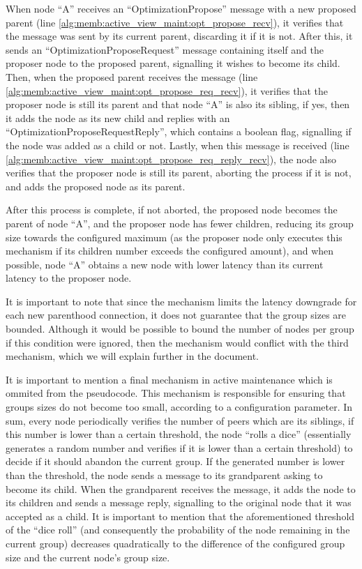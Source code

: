 When node ``A'' receives an ``OptimizationPropose'' message with a new proposed parent (line \ref{alg:memb:active_view_maint:opt_propose_recv}), it verifies that the message was sent by its current parent, discarding it if it is not. After this, it sends an ``OptimizationProposeRequest'' message containing itself and the proposer node to the proposed parent, signalling it wishes to become its child. Then, when the proposed parent receives the message (line \ref{alg:memb:active_view_maint:opt_propose_req_recv}), it verifies that the proposer node is still its parent and that node ``A'' is also its sibling, if yes, then it adds the node as its new child and replies with an ``OptimizationProposeRequestReply'', which contains a boolean flag, signalling if the node was added as a child or not. Lastly, when this message is received (line \ref{alg:memb:active_view_maint:opt_propose_req_reply_recv}), the node also verifies that the proposer node is still its parent, aborting the process if it is not, and adds the proposed node as its parent.

After this process is complete, if not aborted, the proposed node becomes the parent of node ``A'', and the proposer node has fewer children, reducing its group size towards the configured maximum (as the proposer node only executes this mechanism if its children number exceeds the configured amount), and when possible, node ``A'' obtains a new node with lower latency than its current latency to the proposer node.

It is important to note that since the mechanism limits the latency downgrade for each new parenthood connection, it does not guarantee that the group sizes are bounded. Although it would be possible to bound the number of nodes per group if this condition were ignored, then the mechanism would conflict with the third mechanism, which we will explain further in the document. 

It is important to mention a final mechanism in active maintenance which is ommited from the pseudocode. This mechanism is responsible for ensuring that groups sizes do not become too small, according to a configuration parameter. In sum, every node periodically verifies the number of peers which are its siblings, if this number is lower than a certain threshold, the node ``rolls a dice'' (essentially generates a random number and verifies if it is lower than a certain threshold) to decide if it should abandon the current group. If the generated number is lower than the threshold, the node sends a message to its grandparent asking to become its child. When the grandparent receives the message, it adds the node to its children and sends a message reply, signalling to the original node that it was accepted as a child. It is important to mention that the aforementioned threshold of the ``dice roll'' (and consequently the probability of the node remaining in the current group) decreases quadratically to the difference of the configured group size and the current node's group size.

